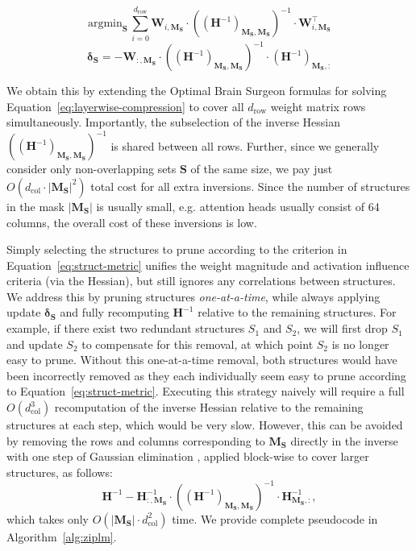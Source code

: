 \documentclass{article}
\theoremstyle{plain}
\theoremstyle{definition}
\theoremstyle{remark}
\begin{document}
\begin{equation}
    \label{eq:struct-metric}
    \text{argmin}_\mathbf{S} \, \sum_{i = 0}^{d_\text{row}} \mathbf{W}_{i,\mathbf{M_S}} \cdot \left(\left(\mathbf{H}^{-1}\right)_{\mathbf{M_S},\mathbf{M_S}}\right)^{-1} \cdot \mathbf{W}^\top_{i,\mathbf{M_S}}
\end{equation}
\begin{equation}
    \boldsymbol{\delta_S} = -\mathbf{W}_{:, \mathbf{M_S}} \cdot \left(\left(\mathbf{H}^{-1}\right)_{\mathbf{M_S},\mathbf{M_S}}\right)^{-1} \cdot \left(\mathbf{H}^{-1}\right)_{\mathbf{M_S}, :}
\end{equation}

We obtain this by extending the Optimal Brain Surgeon \cite{hassibi1993second, obert} formulas for solving Equation~\ref{eq:layerwise-compression} to cover all $d_\text{row}$ weight matrix rows simultaneously. Importantly, the subselection of the inverse Hessian $((\mathbf{H}^{-1})_{\mathbf{M_S},\mathbf{M_S}})^{-1}$ is shared between all rows. Further, since we generally consider only non-overlapping sets $\mathbf{S}$ of the same size, we pay just $O(d_\text{col} \cdot |\mathbf{M_S}|^2)$ total cost for all extra inversions. Since the number of structures in the mask  $|\mathbf{M_S}|$ is usually small, e.g. attention heads usually consist of 64 columns, the overall cost of these inversions is low.

Simply selecting the structures to prune according to the criterion in Equation~\ref{eq:struct-metric} unifies the weight magnitude and activation influence criteria (via the Hessian), but still ignores any correlations between structures. We address this by pruning structures \emph{one-at-a-time}, while always applying update $\boldsymbol{\delta_S}$ and fully recomputing $\mathbf{H}^{-1}$ relative to the remaining structures. For example, if there exist two redundant structures $S_1$ and $S_2$, we will first drop $S_1$ and update $S_2$ to compensate for this removal, at which point $S_2$ is no longer easy to prune. Without this one-at-a-time removal, both structures would have been incorrectly removed as they each individually seem easy to prune according to Equation~\ref{eq:struct-metric}.
Executing this strategy naively will require a full $O(d_\text{col}^3)$ recomputation of the inverse Hessian relative to the remaining structures at each step, which would be very slow. However, this can be avoided by removing the rows and columns corresponding to $\mathbf{M_S}$ directly in the inverse with one step of Gaussian elimination \cite{frantar2022obc}, applied block-wise to cover larger structures, as follows: 
\begin{equation}
    \mathbf{H}^{-1} - \mathbf{H}^{-1}_{:, \mathbf{M_S}} \cdot \left(\left(\mathbf{H}^{-1}\right)_{\mathbf{M_S},\mathbf{M_S}}\right)^{-1} \cdot \mathbf{H}^{-1}_{\mathbf{M_S}, :},
\end{equation}
which takes only $O(|\mathbf{M_S}| \cdot d_\text{col}^2)$ time.
We provide complete pseudocode in Algorithm~\ref{alg:ziplm}. 
\end{document}
